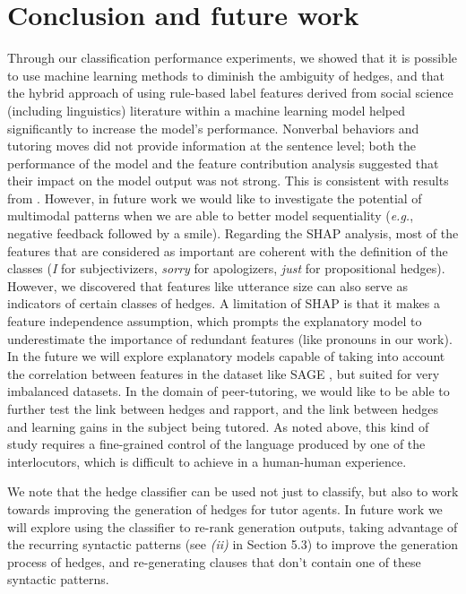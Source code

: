 \documentclass[11pt]{article}
\begin{document}
\section{Conclusion and future work}

\noindent Through our classification performance experiments, we showed that it is possible to use machine learning methods to diminish the ambiguity of hedges, and that the hybrid approach of using rule-based label features derived from social science (including linguistics) literature within a machine learning model helped significantly to increase the model's performance.  
Nonverbal behaviors and tutoring moves did not provide information at the sentence level; both the performance of the model and the feature contribution analysis suggested that their impact on the model output was not strong. This is consistent with results from \citet{Goel2019}. However, in future work we would like to investigate the potential of multimodal patterns when we are able to better model sequentiality (\textit{e.g.}, negative feedback followed by a smile).
\noindent Regarding the SHAP analysis, most of the features that are considered as important are coherent with the definition of the classes (\textit{I} for subjectivizers, \textit{sorry} for apologizers, \textit{just} for propositional hedges). However, we discovered that features like utterance size can also serve as indicators of certain classes of hedges.
\noindent A limitation of SHAP is that it makes a feature independence assumption, which prompts the explanatory model to underestimate the importance of redundant features (like pronouns in our work). In the future we will explore explanatory models capable of taking into account the correlation between features in the dataset like SAGE \cite{Covert2020}, but suited for very imbalanced datasets.
\noindent In the domain of peer-tutoring, we would like to be able to further test the link between hedges and rapport, and the link between hedges and learning gains in the subject being tutored. As noted above, this kind of study requires a fine-grained control of the language produced by one of the interlocutors, which is difficult to achieve in a human-human experience. 

\noindent We note that the hedge classifier can be used not just to classify, but also to work towards improving the generation of hedges for tutor agents. In future work we will explore using the classifier to re-rank generation outputs,  taking advantage of the recurring syntactic patterns (see \textit{(ii)} in Section 5.3) to improve the generation process of hedges, and re-generating clauses that don’t contain one of these syntactic patterns.
\end{document}
